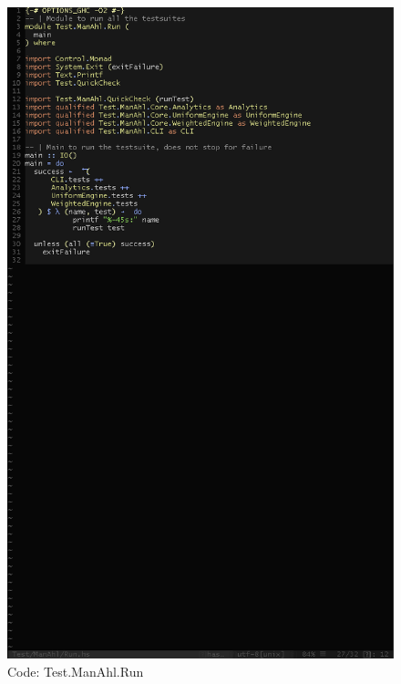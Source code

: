 \documentclass[12pt,a4paper,article]{memoir} %
\begin{document}
\begin{figure}[h!]
\centering
\includegraphics[width=1\textwidth]{img/code-test-run.png}
\caption{Code: Test.ManAhl.Run}
\label{fig:test.run}
\end{figure}
\end{document}
